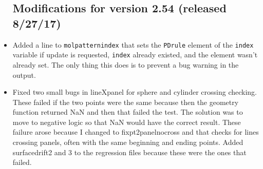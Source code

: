 \documentclass {scrbook}
\newcommand {\ttt} {\texttt}
\begin{document}
\begin{itemize}
\subsection{Modifications for version 2.54 (released 8/27/17)}
\item Added a line to \ttt{molpatternindex} that sets the \ttt{PDrule} element of the \ttt{index} variable if update is requested, \ttt{index} already existed, and the element wasn't already set. The only thing this does is to prevent a bug warning in the output.
\item Fixed two small bugs in lineXpanel for sphere and cylinder crossing checking. These failed if the two points were the same because then the geometry function returned NaN and then that failed the test. The solution was to move to negative logic so that NaN would have the correct result. These failure arose because I changed to fixpt2panelnocross and that checks for lines crossing panels, often with the same beginning and ending points. Added surfacedrift2 and 3 to the regression files because these were the ones that failed.


\end{itemize}
\end{document}
